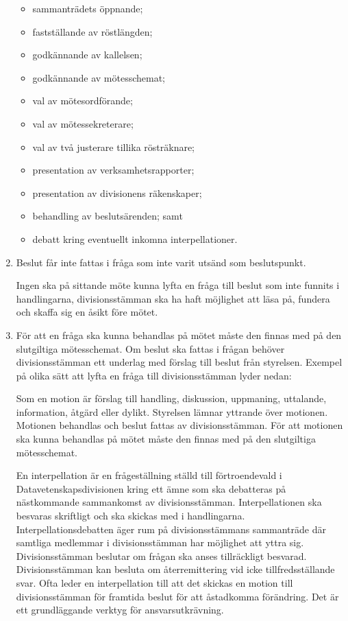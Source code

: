 \documentclass{dvd}
\begin{document}
\begin{enumerate}[label=\arabic* §, ref=\arabic*]
	      \begin{itemize}
		      \item sammanträdets öppnande;
		      \item fastställande av röstlängden;
		      \item godkännande av kallelsen;
		      \item godkännande av mötesschemat;
		      \item val av mötesordförande;
		      \item val av mötessekreterare;
		      \item val av två justerare tillika rösträknare;
		      \item presentation av verksamhetsrapporter;
		      \item presentation av divisionens räkenskaper;
		      \item behandling av beslutsärenden; samt
		      \item debatt kring eventuellt inkomna interpellationer.
	      \end{itemize}

	\item Beslut får inte fattas i fråga som inte varit utsänd som beslutspunkt.

	      Ingen ska på sittande möte kunna lyfta en fråga till beslut som inte funnits i handlingarna, divisionsstämman ska ha haft möjlighet att läsa på, fundera och skaffa sig en åsikt före mötet.

	\item För att en fråga ska kunna behandlas på mötet måste den finnas med på den slutgiltiga mötesschemat.
	      Om beslut ska fattas i frågan behöver divisionsstämman ett underlag med förslag till beslut från styrelsen.
	      Exempel på olika sätt att lyfta en fråga till divisionsstämman lyder nedan:

	      Som en motion är förslag till handling, diskussion, uppmaning, uttalande, information, åtgärd eller dylikt.
	      Styrelsen lämnar yttrande över motionen.
	      Motionen behandlas och beslut fattas av divisionsstämman.
	      För att motionen ska kunna behandlas på mötet måste den finnas med på den slutgiltiga mötesschemat.

	      En interpellation är en frågeställning ställd till förtroendevald i Datavetenskapsdivisionen kring ett ämne som ska debatteras på nästkommande sammankomst av divisionsstämman.
	      Interpellationen ska besvaras skriftligt och ska skickas med i handlingarna.
	      Interpellationsdebatten äger rum på divisionsstämmans sammanträde där samtliga medlemmar i divisionsstämman har möjlighet att yttra sig.
	      Divisionsstämman beslutar om frågan ska anses tillräckligt besvarad.
	      Divisionsstämman kan besluta om återremittering vid icke tillfredsställande svar.
	      Ofta leder en interpellation till att det skickas en motion till divisionsstämman för framtida beslut för att åstadkomma förändring.
	      Det är ett grundläggande verktyg för ansvarsutkrävning.


\end{enumerate}
\end{document}
